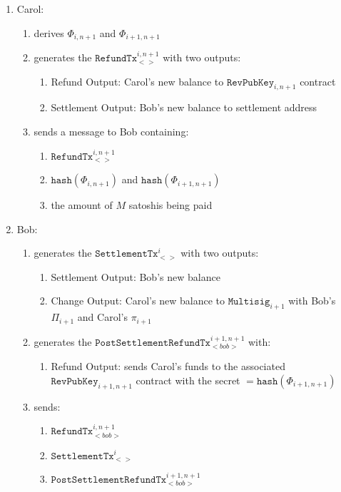 \documentclass{llncs}
\begin{document}
\begin{enumerate}
\item Carol:
  \begin{enumerate}
  \item derives $\Phi_{i,n+1}$ and $\Phi_{i+1,n+1}$
  \item generates the $\texttt{RefundTx}_{<>}^{i,n+1}$ with two outputs:
    \begin{enumerate}
    \item Refund Output: Carol's new balance to $\texttt{RevPubKey}_{i,n+1}$
contract
    \item Settlement Output: Bob's new balance to settlement address
    \end{enumerate}
  \item sends a message to Bob containing:
    \begin{enumerate}
    \item $\texttt{RefundTx}_{<>}^{i,n+1}$
    \item $\texttt{hash}(\Phi_{i,n+1})$ and $\texttt{hash}(\Phi_{i+1,n+1})$
    \item the amount of $M$ satoshis being paid
    \end{enumerate}
  \end{enumerate}
\item Bob:
  \begin{enumerate}
  \item generates the $\texttt{SettlementTx}_{<>}^{i}$ with two outputs:
    \begin{enumerate}
    \item Settlement Output: Bob's new balance
    \item Change Output: Carol's new balance to $\texttt{Multisig}_{i+1}$ with
Bob's $\Pi_{i+1}$ and Carol's $\pi_{i+1}$
    \end{enumerate}
  \item generates the $\texttt{PostSettlementRefundTx}_{<bob>}^{i+1,n+1}$ with:
    \begin{enumerate}
    \item Refund Output: sends Carol's funds to the associated
$\texttt{RevPubKey}_{i+1,n+1}$ contract with the secret $=
\texttt{hash}(\Phi_{i+1,n+1})$
    \end{enumerate}
  \item sends:
    \begin{enumerate}
    \item $\texttt{RefundTx}_{<bob>}^{i,n+1}$
    \item $\texttt{SettlementTx}_{<>}^{i}$
    \item $\texttt{PostSettlementRefundTx}_{<bob>}^{i+1,n+1}$

\end{enumerate}
\end{enumerate}
\end{enumerate}
\end{document}
